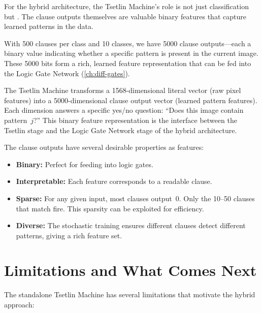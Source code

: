 For the hybrid architecture, the Tsetlin Machine's role is not just
classification but . The clause outputs
themselves are valuable binary features that capture learned patterns
in the data.

With 500 clauses per class and 10 classes, we have 5000 clause
outputs---each a binary value indicating whether a specific pattern
is present in the current image. These 5000 bits form a rich,
learned feature representation that can be fed into the Logic Gate
Network (\cref{ch:diff-gates}).

\begin{keyinsight}
The Tsetlin Machine transforms a 1568-dimensional literal vector
(raw pixel features) into a 5000-dimensional clause output vector
(learned pattern features). Each dimension answers a specific
yes/no question: ``Does this image contain pattern~$j$?'' This
binary feature representation is the interface between the Tsetlin
stage and the Logic Gate Network stage of the hybrid architecture.
\end{keyinsight}

The clause outputs have several desirable properties as features:
\begin{itemize}
  \item \textbf{Binary:} Perfect for feeding into logic gates.
  \item \textbf{Interpretable:} Each feature corresponds to a
    readable clause.
  \item \textbf{Sparse:} For any given input, most clauses output~0.
    Only the 10--50 clauses that match fire. This sparsity can be
    exploited for efficiency.
  \item \textbf{Diverse:} The stochastic training ensures different
    clauses detect different patterns, giving a rich feature set.
\end{itemize}


\section{Limitations and What Comes Next}
\label{sec:tm-limitations}

The standalone Tsetlin Machine has several limitations that motivate
the hybrid approach:

